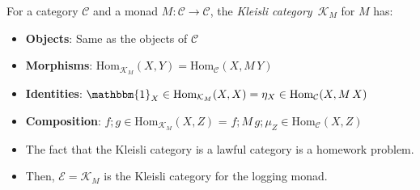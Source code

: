 \documentclass{lecturenotes}
\renewcommand{\hom}[3][]{\ensuremath{\text{Hom}_{#1}(#2, #3)}}
\newcommand{\id}[1][]{\ensuremath{\mathbbm{1}_{#1}}}
\begin{document}
\begin{defn}
  For a category $\mathcal{C}$ and a monad $M : \mathcal{C} \to \mathcal{C}$, the \emph{Kleisli category}~$\mathcal{K}_M$ for $M$ has:
  \begin{itemize}
  \item \textbf{Objects}: Same as the objects of $\mathcal{C}$
  \item \textbf{Morphisms}: $\hom[\mathcal{K}_M]{X}{Y} = \hom[\mathcal{C}]{X}{M\,Y}$
  \item \textbf{Identities}: $\id[X] \in \hom[\mathcal{K}_M]{X}{X} = \eta_X \in \hom[\mathcal{C}]{X}{M\,X}$
  \item \textbf{Composition}: $f; g \in \hom[\mathcal{K}_M]{X}{Z}$ = $f; M\,g; \mu_Z \in \hom[\mathcal{C}]{X}{Z}$
  \end{itemize}
\end{defn}

\begin{itemize}
\item The fact that the Kleisli category is a lawful category is a homework problem.
\item Then, $\mathcal{E} = \mathcal{K}_M$ is the Kleisli category for the logging monad.
\end{itemize}
\end{document}
